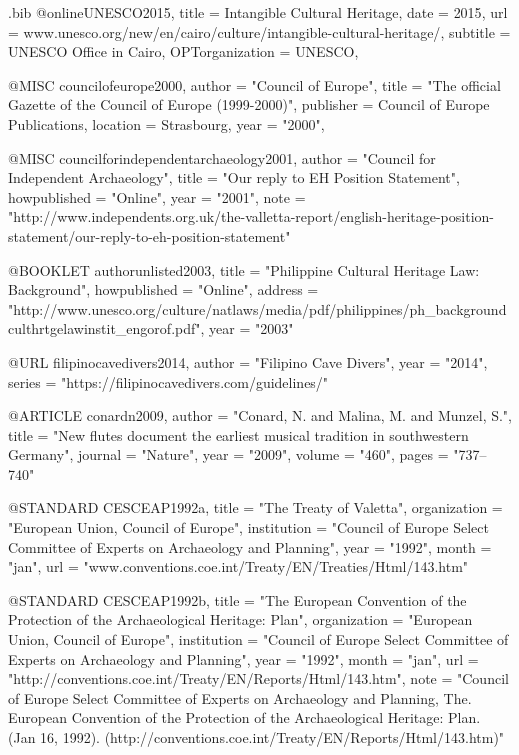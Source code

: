 \begin{filecontents}{\IJSRAidentifier.bib}
@online{UNESCO2015,
	title = {Intangible Cultural Heritage},
	date = {2015},
	url = {www.unesco.org/new/en/cairo/culture/intangible-cultural-heritage/},
	subtitle = {UNESCO Office in Cairo},
	OPTorganization = {UNESCO},
}

@MISC {councilofeurope2000,
author = "Council of Europe",
title  = "The official Gazette of the Council of Europe (1999-2000)",
publisher = {Council of Europe Publications},
location = {Strasbourg},
year   = "2000",
}

@MISC {councilforindependentarchaeology2001,
author       = "Council for Independent Archaeology",
title        = "Our reply to EH Position Statement",
howpublished = "Online",
year         = "2001",
note         = "http://www.independents.org.uk/the-valletta-report/english-heritage-position-statement/our-reply-to-eh-position-statement"
}

@BOOKLET {authorunlisted2003,
title        = "Philippine Cultural Heritage Law: Background",
howpublished = "Online",
address      = "http://www.unesco.org/culture/natlaws/media/pdf/philippines/ph_backgroundculthrtgelawinstit_engorof.pdf",
year         = "2003"
}

@URL {filipinocavedivers2014,
author = "Filipino Cave Divers",
year   = "2014",
series = "https://filipinocavedivers.com/guidelines/"
}

@ARTICLE {conardn2009,
author  = "Conard, N. and Malina, M. and Munzel, S.",
title   = "New flutes document the earliest musical tradition in southwestern Germany",
journal = "Nature",
year    = "2009",
volume  = "460",
pages   = "737--740"
}

@STANDARD {CESCEAP1992a,
title        = "The Treaty of Valetta",
organization = "European Union, Council of Europe",
institution  = "Council of Europe Select Committee of Experts on Archaeology and Planning",
year         = "1992",
month        = "jan",
url          = "www.conventions.coe.int/Treaty/EN/Treaties/Html/143.htm"
}

@STANDARD {CESCEAP1992b,
title        = "The European Convention of the Protection of the Archaeological Heritage: Plan",
organization = "European Union, Council of Europe",
institution  = "Council of Europe Select Committee of Experts on Archaeology and Planning",
year         = "1992",
month        = "jan",
url          = "http://conventions.coe.int/Treaty/EN/Reports/Html/143.htm",
note         = "Council of Europe Select Committee of Experts on Archaeology and Planning, The. European Convention of the Protection of the Archaeological Heritage: Plan. (Jan 16, 1992). (http://conventions.coe.int/Treaty/EN/Reports/Html/143.htm)"
}


\end{filecontents}

